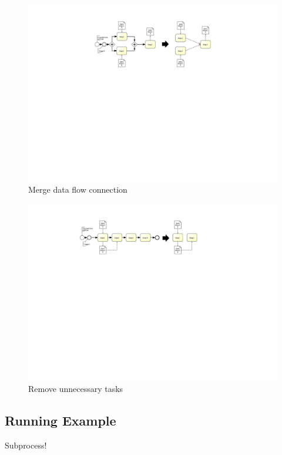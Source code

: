 \begin{figure}[h!]
	\includegraphics[width=\textwidth, trim={8.5cm 13.5cm 8.5cm 2.4cm}]{img/ExtractDFDGateWayMerge.pdf}
	\caption{Merge data flow connection}
	\label{fig:mergeDataFlow}
\end{figure}

\begin{figure}[h!]
	\includegraphics[width=\textwidth, trim={7.5cm 15.3cm 8.5cm 1.5cm}]{img/ExtractDFDRemove.pdf}
	\caption{Remove unnecessary tasks}
	\label{fig:removeDataFlow}
\end{figure}

\pagebreak
\subsection{Running Example}

Subprocess!










